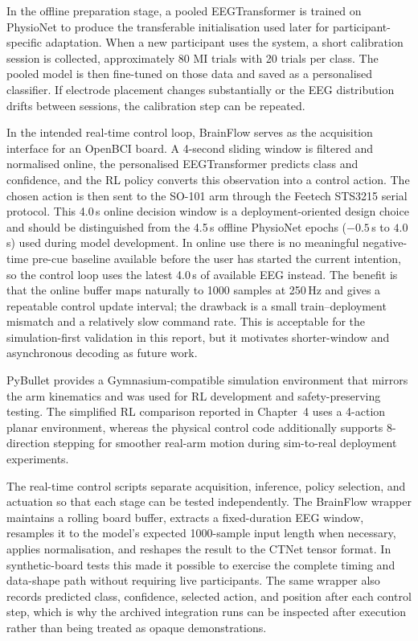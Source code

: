 \documentclass[12pt, a4paper]{article}
\begin{document}
In the offline preparation stage, a pooled EEGTransformer is trained on PhysioNet to produce the transferable initialisation used later for participant-specific adaptation. When a new participant uses the system, a short calibration session is collected, approximately 80 MI trials with 20 trials per class. The pooled model is then fine-tuned on those data and saved as a personalised classifier. If electrode placement changes substantially or the EEG distribution drifts between sessions, the calibration step can be repeated.

In the intended real-time control loop, BrainFlow serves as the acquisition interface for an OpenBCI board. A 4-second sliding window is filtered and normalised online, the personalised EEGTransformer predicts class and confidence, and the RL policy converts this observation into a control action. The chosen action is then sent to the SO-101 arm through the Feetech STS3215 serial protocol. This 4.0\,s online decision window is a deployment-oriented design choice and should be distinguished from the 4.5\,s offline PhysioNet epochs ($-0.5$\,s to $4.0$\,s) used during model development. In online use there is no meaningful negative-time pre-cue baseline available before the user has started the current intention, so the control loop uses the latest 4.0\,s of available EEG instead. The benefit is that the online buffer maps naturally to 1000 samples at 250\,Hz and gives a repeatable control update interval; the drawback is a small train--deployment mismatch and a relatively slow command rate. This is acceptable for the simulation-first validation in this report, but it motivates shorter-window and asynchronous decoding as future work.

PyBullet provides a Gymnasium-compatible simulation environment that mirrors the arm kinematics and was used for RL development and safety-preserving testing. The simplified RL comparison reported in Chapter~4 uses a 4-action planar environment, whereas the physical control code additionally supports 8-direction stepping for smoother real-arm motion during sim-to-real deployment experiments.

The real-time control scripts separate acquisition, inference, policy selection, and actuation so that each stage can be tested independently. The BrainFlow wrapper maintains a rolling board buffer, extracts a fixed-duration EEG window, resamples it to the model's expected 1000-sample input length when necessary, applies normalisation, and reshapes the result to the CTNet tensor format. In synthetic-board tests this made it possible to exercise the complete timing and data-shape path without requiring live participants. The same wrapper also records predicted class, confidence, selected action, and position after each control step, which is why the archived integration runs can be inspected after execution rather than being treated as opaque demonstrations.
\end{document}
